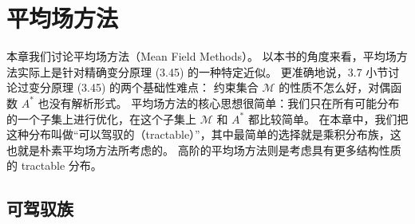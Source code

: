 \chapter{平均场方法}

本章我们讨论平均场方法（Mean Field Methods）。
以本书的角度来看，平均场方法实际上是针对精确变分原理 (3.45) 的一种特定近似。
更准确地说，3.7 小节讨论过变分原理 (3.45) 的两个基础性难点：
约束集合 $\mathcal{M}$ 的性质不怎么好，对偶函数 $A^*$ 也没有解析形式。
平均场方法的核心思想很简单：我们只在所有可能分布的一个子集上进行优化，在这个子集上 $\mathcal{M}$ 和 $A^*$ 都比较简单。
在本章中，我们把这种分布叫做“可以驾驭的（tractable）”，其中最简单的选择就是乘积分布族，这也就是朴素平均场方法所考虑的。
高阶的平均场方法则是考虑具有更多结构性质的 tractable 分布。

\section{可驾驭族}

